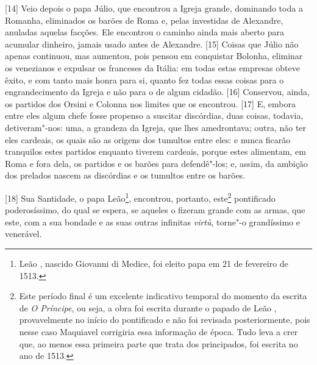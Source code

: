 {[}14{]} Veio depois o papa Júlio, que encontrou a Igreja grande,
dominando toda a Romanha, eliminados os barões de Roma e, pelas
investidas de Alexandre, anuladas aquelas facções. Ele encontrou o
caminho ainda mais aberto para acumular dinheiro, jamais usado antes de
Alexandre. {[}15{]} Coisas que Júlio não apenas continuou, mas aumentou,
pois pensou em conquistar Bolonha, eliminar os venezianos e expulsar os
franceses da Itália: em todas estas empresas obteve êxito, e com tanto
mais honra para si, quanto fez todas essas coisas para o engrandecimento
da Igreja e não para o de algum cidadão. {[}16{]} Conservou, ainda, os
partidos dos Orsini e Colonna nos limites que os encontrou. {[}17{]} E,
embora entre eles algum chefe fosse propenso a suscitar discórdias, duas
coisas, todavia, detiveram"-nos: uma, a grandeza da Igreja, que lhes
amedrontava; outra, não ter eles cardeais, os quais são as origens dos
tumultos entre eles: e nunca ficarão tranquilos estes partidos enquanto
tiverem cardeais, porque estes alimentam, em Roma e fora dela, os partidos e os barões para
defendê"-los; e, assim, da ambição dos prelados nascem as discórdias e os
tumultos entre os barões.

{[}18{]} Sua Santidade, o papa Leão\footnote{Leão , nascido Giovanni di
  Medice, foi eleito papa em 21 de fevereiro de 1513.}, encontrou,
portanto, este\footnote{Este período final é um excelente indicativo
  temporal do momento da escrita de \emph{O Príncipe}, ou seja, a obra
  foi escrita durante o papado de Leão , provavelmente no início do
  pontificado e não foi revisada posteriormente, pois nesse caso
  Maquiavel corrigiria essa informação de época. Tudo leva a crer que,
  ao menos essa primeira parte que trata dos principados, foi escrita no
  ano de 1513.} pontificado poderosíssimo, do qual se espera, se aqueles
o fizeram grande com as armas, que este, com a sua bondade e as suas
outras infinitas \emph{virtù}, torne"-o grandíssimo e venerável.


